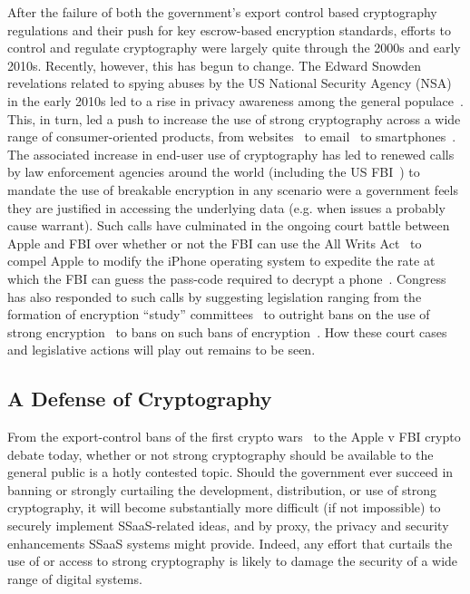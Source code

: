 After the failure of both the government's export control based
cryptography regulations and their push for key escrow-based
encryption standards, efforts to control and regulate cryptography
were largely quite through the 2000s and early 2010s. Recently,
however, this has begun to change. The Edward Snowden revelations
related to spying abuses by the US National Security Agency (NSA) in
the early 2010s led to a rise in privacy awareness among the general
populace~\cite{pew-privsec14}. This, in turn, led a push to increase
the use of strong cryptography across a wide range of
consumer-oriented products, from websites~\cite{mozilla-deprecatehttp}
to email~\cite{gmail-blog-encryption} to
smartphones~\cite{ars-ios-encrypt, ars-android-encrypt}. The
associated increase in end-user use of cryptography has led to renewed
calls by law enforcement agencies around the world (including the US
FBI~\cite{comey-testimony-encryption}) to mandate the use of breakable
encryption in any scenario were a government feels they are justified
in accessing the underlying data (e.g. when issues a probably cause
warrant). Such calls have culminated in the ongoing court battle
between Apple and FBI over whether or not the FBI can use the All
Writs Act~\cite{usc-allwrits} to compel Apple to modify the iPhone
operating system to expedite the rate at which the FBI can guess the
pass-code required to decrypt a phone~\cite{ars-cookvfbi}. Congress
has also responded to such calls by suggesting legislation ranging
from the formation of encryption ``study'' committees~\cite{hr4651} to
outright bans on the use of strong encryption~\cite{bennett-burrbill}
to bans on such bans of encryption~\cite{hr4528}. How these court
cases and legislative actions will play out remains to be seen.

\subsection{A Defense of Cryptography}

From the export-control bans of the first crypto wars~\cite{kehl2015}
to the Apple v FBI crypto debate today, whether or not strong
cryptography should be available to the general public is a hotly
contested topic. Should the government ever succeed in banning or
strongly curtailing the development, distribution, or use of strong
cryptography, it will become substantially more difficult (if not
impossible) to securely implement SSaaS-related ideas, and by proxy,
the privacy and security enhancements SSaaS systems might
provide. Indeed, any effort that curtails the use of or access to
strong cryptography is likely to damage the security of a wide range
of digital systems.

